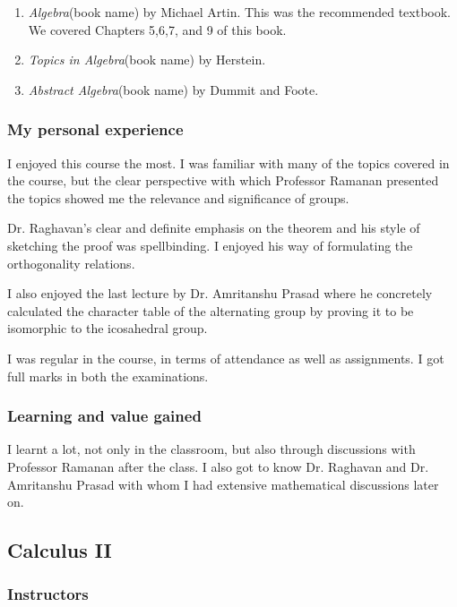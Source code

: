 \documentclass[a4paper]{amsart}
\newcommand{\bookname}[1]{{\em #1}{\small{(book name)}}}
\begin{document}
\begin{enumerate}

\item \bookname{Algebra} by Michael Artin. This was the recommended textbook.
  We covered Chapters 5,6,7, and 9 of this book.

\item \bookname{Topics in Algebra} by Herstein.

\item \bookname{Abstract Algebra} by Dummit and Foote.

\end{enumerate}

\subsubsection{My personal experience}

I enjoyed this course the most. I was familiar with many of the topics covered in the course, but the clear perspective
with which Professor Ramanan presented the topics showed me the relevance and significance of groups. 

Dr. Raghavan's clear and definite emphasis on the theorem and his style of sketching the proof was spellbinding.
I enjoyed his way of formulating the orthogonality relations.

I also enjoyed the last lecture by Dr. Amritanshu Prasad where he concretely calculated the character table of the
alternating group by proving it to be isomorphic to the icosahedral group.

I was regular in the course, in terms of attendance as well as assignments. I got full marks in both the examinations.

\subsubsection{Learning and value gained}

I learnt a lot, not only in the classroom, but also through
discussions with Professor Ramanan after the class.  I also got to
know Dr. Raghavan and Dr. Amritanshu Prasad with whom I had extensive
mathematical discussions later on.

\subsection{Calculus II}\label{calculus2}

\subsubsection{Instructors}
\end{document}
